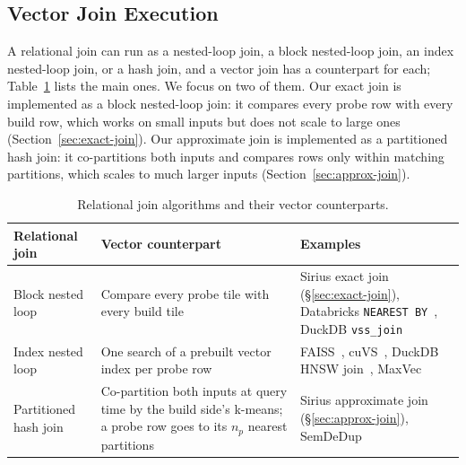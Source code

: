 \subsection{Vector Join Execution}\label{sec:vector-join-execution}

A relational join can run as a nested-loop join, a block nested-loop join, an index nested-loop join, or a hash join, and a vector join has a counterpart for each; Table~\ref{tab:join-analogy} lists the main ones.
We focus on two of them.
Our exact join is implemented as a block nested-loop join: it compares every probe row with every build row, which works on small inputs but does not scale to large ones (Section~\ref{sec:exact-join}).
Our approximate join is implemented as a partitioned hash join: it co-partitions both inputs and compares rows only within matching partitions, which scales to much larger inputs (Section~\ref{sec:approx-join}).

\begin{table}[t]
    \centering\footnotesize
    \setlength{\tabcolsep}{3pt}
    \begin{tabular}{@{}p{}p{}p{}@{}}
        \toprule
        \raggedright Relational join & \raggedright Vector counterpart & \raggedright Examples \tabularnewline
        \midrule
        \rowcolor{black!6}\raggedright Block nested loop & \raggedright Compare every probe tile with every build tile & \raggedright Sirius exact join (\S\ref{sec:exact-join}), Databricks \texttt{NEAREST BY}~\cite{DatabricksNearestByJoinBlog26}, DuckDB \texttt{vss\_join}~\cite{DuckDBVSS} \tabularnewline
        \raggedright Index nested loop & \raggedright One search of a prebuilt vector index per probe row & \raggedright FAISS~\cite{JohnsonFaissGPU21}, cuVS~\cite{NvidiaCuVS26}, DuckDB HNSW join~\cite{DuckDBVSSBlog24}, MaxVec~\cite{MaxVec26} \tabularnewline
        \rowcolor{black!6}\raggedright Partitioned hash join & \raggedright Co-partition both inputs at query time by the build side's k-means; a probe row goes to its $n_p$ nearest partitions & \raggedright Sirius approximate join (\S\ref{sec:approx-join}), SemDeDup~\cite{AbbasSemDeDup23} \tabularnewline
        \bottomrule
    \end{tabular}
    \caption{Relational join algorithms and their vector counterparts.}
    \label{tab:join-analogy}
\end{table}


